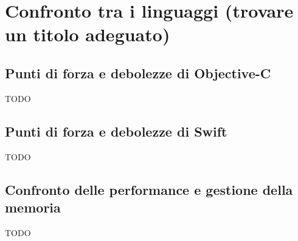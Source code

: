 \chapter{Confronto tra i linguaggi (trovare un titolo adeguato)}

\section{Punti di forza e debolezze di Objective-C}
TODO
\section{Punti di forza e debolezze di Swift}
TODO
\section{Confronto delle performance e gestione della memoria}
TODO
